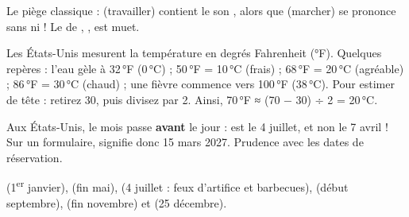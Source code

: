 \begin{astuce}
Le piège classique :   (travailler) contient le son , alors que 
 (marcher) se prononce sans  ni  ! Le  de , ,  est
muet.
\end{astuce}


\begin{culture}
Les États-Unis mesurent la température en degrés Fahrenheit (°F). Quelques repères : l'eau gèle à
32\,°F (0\,°C) ; 50\,°F = 10\,°C (frais) ; 68\,°F = 20\,°C (agréable) ; 86\,°F = 30\,°C (chaud) ; une
fièvre commence vers 100\,°F (38\,°C). Pour estimer de tête : retirez 30, puis divisez par 2. Ainsi,
70\,°F ≈ (70 − 30) ÷ 2 = 20\,°C.
\end{culture}

\begin{paire}
\begin{culture}
Aux États-Unis, le mois passe \textbf{avant} le jour :  est le 4 juillet, et non le 7 avril !
Sur un formulaire,  signifie donc 15 mars 2027. Prudence avec les dates de réservation.
\end{culture}
\begin{culture}
 (1\textsuperscript{er} janvier),  (fin mai), 
(4 juillet : feux d'artifice et barbecues),  (début septembre),  (fin
novembre) et  (25 décembre).
\end{culture}
\end{paire}


\begin{tcbraster}[raster columns=3,raster equal height=rows,raster column skip=3mm,raster row skip=3mm,raster before skip=1mm]
\end{tcbraster}

